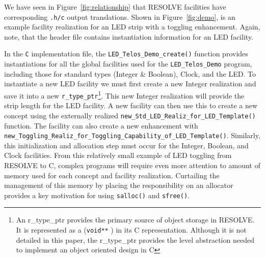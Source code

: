 We have seen in Figure~\ref{fig:relationship} that RESOLVE facilities have corresponding \texttt{.h/c} output translations. Shown in Figure~\ref{fig:demo}, is an example facility realization for an LED strip with a toggling enhancement. Again, note, that the header file contains instantiation information for an LED facility.


In the \texttt{C} implementation file, the \texttt{LED\_Telos\_Demo\_create()} function provides instantiations for all the global facilities used for the \texttt{LED\_Telos\_Demo} program, including those for standard types (Integer \& Boolean), Clock, and the LED. To instantiate a new LED facility we must first create a new Integer realization and save it into a new \texttt{r\_type\_ptr}\footnote{An r\_type\_ptr provides the primary source of object storage in RESOLVE. It is represented as a (\texttt{void**} ) in its C representation. Although it is not detailed in this paper, the r\_type\_ptr provides the level abstraction needed to implement an object oriented design in C}. This new Integer realization will provide the strip length for the LED facility. A new facility can then use this to create a new concept using the externally realized \texttt{new\_Std\_LED\_Realiz\_for\_LED\_Template()} function. The facility can also create a new enhancement with \texttt{new\_Toggling\_Realiz\_for\_Toggling\_Capability\_of\_LED\_Template()}. Similarly, this initialization and allocation step must occur for the Integer, Boolean, and Clock facilities. From this relatively small example of LED toggling from RESOLVE to C,  complex programs will require even more attention to amount of memory used for each concept and facility realization. Curtailing the management of this memory by placing the responsibility on an allocator provides a key motivation for using \texttt{salloc()} and \texttt{sfree()}.


